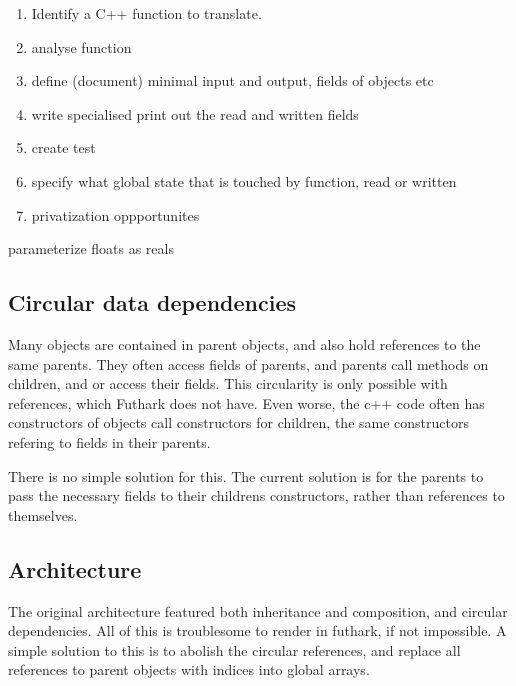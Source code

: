 \begin{enumerate}
  \item Identify a C++ function to translate.
  \item analyse function
  \item define (document) minimal input and output, fields of objects etc
  \item write specialised print out the read and written fields
  \item create test
  \item specify what global state that is touched by function, read or written
  \item privatization oppportunites
\end{enumerate}
parameterize floats as reals

\subsection{Circular data dependencies}
Many objects are contained in parent objects, and also hold references to the same parents. They often access fields of parents, and parents call methods on children, and or access their fields. This circularity is only possible with references, which Futhark does not have. Even worse, the c++ code often has constructors of objects call constructors for children, the same constructors refering to fields in their parents.

There is no simple solution for this. The current solution is for the parents to pass the necessary fields to their childrens constructors, rather than references to themselves.

\subsection{Architecture}
The original architecture featured both inheritance and composition, and circular dependencies. All of this is troublesome to render in futhark, if not impossible. A simple solution to this is to abolish the circular references, and replace all references to parent objects with indices into global arrays.
